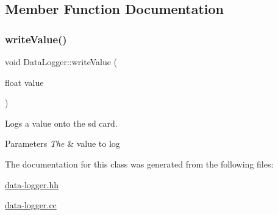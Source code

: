 \subsection{Member Function Documentation}
\mbox{\label{class_data_logger_a6bc493c434d247169fdcca030eed7451}} 
\subsubsection{\texorpdfstring{write\+Value()}{writeValue()}}
{\footnotesize\ttfamily void Data\+Logger\+::write\+Value (\begin{DoxyParamCaption}\item[{float}]{value }\end{DoxyParamCaption})}



Logs a value onto the sd card. 


\begin{DoxyParams}{Parameters}
{\em The} & value to log \\
\hline
\end{DoxyParams}


The documentation for this class was generated from the following files\+:\begin{DoxyCompactItemize}
\item 
\hyperlink{data-logger_8hh}{data-\/logger.\+hh}\item 
\hyperlink{data-logger_8cc}{data-\/logger.\+cc}\end{DoxyCompactItemize}
